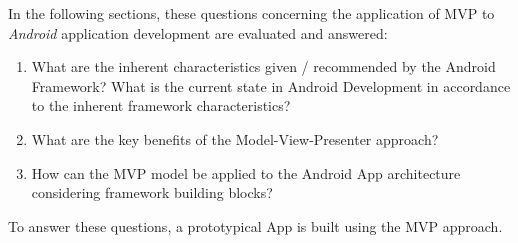 In the following sections, these questions concerning the application of MVP to \emph{Android} application development are evaluated and answered:

\begin{enumerate}[label={RQ\arabic*:}, leftmargin=0.95cm]
\item What are the inherent characteristics given / recommended by the Android Framework? What is the current state in Android Development in accordance to the inherent framework characteristics?
\item What are the key benefits of the Model-View-Presenter approach?
\item How can the MVP model be applied to the Android App architecture considering framework building blocks?
\end{enumerate}

To answer these questions, a prototypical App is built using the MVP approach.
